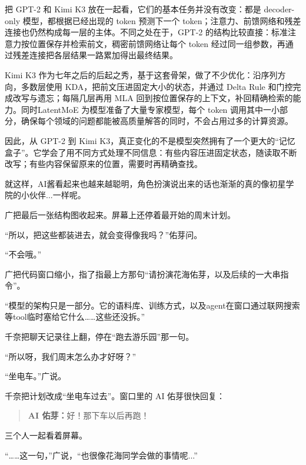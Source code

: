 把 GPT-2 和 Kimi K3 放在一起看，它们的基本任务并没有改变：都是 decoder-only 模型，都根据已经出现的 token 预测下一个 token；注意力、前馈网络和残差连接也仍然构成每一层的主体。不同之处在于，GPT-2 的结构比较直接：标准注意力按位置保存并检索前文，稠密前馈网络让每个 token 经过同一组参数，再通过残差连接把各层结果一路累加得出最终结果。

Kimi K3 作为七年之后的后起之秀，基于这套骨架，做了不少优化：沿序列方向，多数层使用 KDA，把前文压进固定大小的状态，并通过 Delta Rule 和门控完成改写与遗忘；每隔几层再用 MLA 回到按位置保存的上下文，补回精确检索的能力。同时LatentMoE 为模型准备了大量专家模型，每个 token 调用其中一小部分，确保每个领域的问题都能被高质量解答的同时，不会占用过多的计算资源。

因此，从 GPT-2 到 Kimi K3，真正变化的不是模型突然拥有了一个更大的“记忆盒子”。它学会了用不同方式处理不同信息：有些内容压进固定状态，随读取不断改写；有些内容保留原来的位置，需要时再精确查找。

就这样，AI酱看起来也越来越聪明，角色扮演说出来的话也渐渐的真的像初星学院的小伙伴...一样呢。

\bigskip

广把最后一张结构图收起来。屏幕上还停着最开始的周末计划。

“所以，把这些都装进去，就会变得像我吗？”佑芽问。

“不会哦。”

广把代码窗口缩小，指了指最上方那句“请扮演花海佑芽，以及后续的一大串指令”。

“模型的架构只是一部分。它的语料库、训练方式，以及agent在窗口通过联网搜索等tool临时塞给它什么……这些还没拆。”

千奈把聊天记录往上翻，停在“跑去游乐园”那一句。

“所以呀，我们周末怎么办才好呀？”

“坐电车。”广说。

千奈把计划改成“坐电车过去”。窗口里的 AI 佑芽很快回复：

\begin{quote}
\textbf{AI 佑芽：}好！那下车以后再跑！
\end{quote}

三个人一起看着屏幕。

“……这一句，”广说，“也很像花海同学会做的事情呢...”

